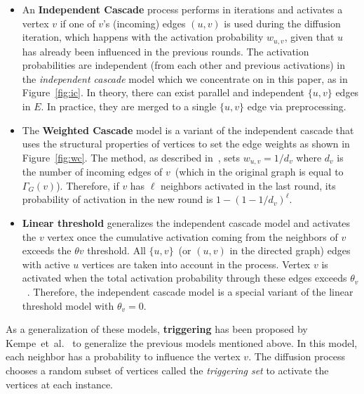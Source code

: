 \documentclass[10pt,journal,compsoc]{IEEEtran}
\begin{document}
\begin{itemize}[leftmargin=*]
\item An {\bf Independent Cascade} process performs in iterations and activates a vertex $v$  if one of $v$'s (incoming) edges $(u, v)$ is 
used during the diffusion iteration, which happens with the activation probability $w_{u, v}$, given that $u$ has already been influenced in the previous rounds. The activation probabilities are independent (from each other and previous activations) in the {\em independent cascade} model which we concentrate on in this paper, as in Figure~\ref{fig:ic}.
In theory, there can exist parallel and independent $\{u, v\}$ edges in $E$. In practice, they are merged to a single $\{u,v\}$ edge via preprocessing. 

\item The {\bf Weighted Cascade}  model is a variant of the independent cascade that uses the structural properties of vertices to set the edge weights as shown in Figure~\ref{fig:wc}.
The method, as described in~\cite{MixGreedy}, sets $w_{u, v} = 1 / d_v$ where $d_v$ is the number 
of incoming edges of $v$~(which in the original graph is equal to $\Gamma _G(v)$).
Therefore, if $v$ has $\ell$ neighbors activated in the last round, its probability of activation in the new round is $1-( 1-1 / d_v)^\ell$. 


\item{\bf Linear threshold} generalizes the independent cascade model and activates the $v$ vertex once the cumulative activation coming from the neighbors of $v$ exceeds the $\theta v$ threshold. 
All $\{u, v\}$~(or $(u, v)$ in the directed graph) edges with active $u$ vertices are taken into account in the process. Vertex $v$ is activated when the total activation probability through these edges exceeds $\theta_v$~\cite{kempe2003maximizing}.  
Therefore, the independent cascade model is a special variant of the linear threshold model with $\theta_v = 0$. 
\end{itemize}

As a generalization of these models, {\bf triggering} has been proposed by Kempe~et~al.~\cite{kempe2003maximizing} to generalize the previous models mentioned above. In this model, each neighbor has a probability to influence the vertex $v$. The diffusion process chooses a random subset of vertices called the {\em triggering set} to activate the vertices at each instance.
\end{document}

